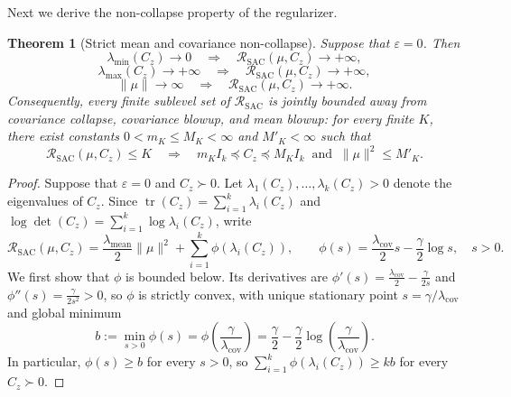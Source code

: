 \documentclass{article} %
\newtheorem{theorem}{Theorem}[section]
\theoremstyle{remark}
\begin{document}
{\color{blue}

Next we derive the non-collapse property of the regularizer.
 
\begin{theorem}[Strict mean and covariance non-collapse]
\label{thm:strict-covariance-non-collapse}
Suppose that \(\varepsilon=0\). Then
\begin{equation}
\lambda_{\min}(C_z)\to0
\quad\Longrightarrow\quad
\mathcal{R}_{\mathrm{SAC}}(\mu,C_z)\to+\infty,
\label{eq:covariance-collapse-barrier}
\end{equation}
\begin{equation}
\lambda_{\max}(C_z)\to+\infty
\quad\Longrightarrow\quad
\mathcal{R}_{\mathrm{SAC}}(\mu,C_z)\to+\infty,
\label{eq:covariance-scale-barrier}
\end{equation}
\begin{equation}
\|\mu\|\to\infty
\quad\Longrightarrow\quad
\mathcal{R}_{\mathrm{SAC}}(\mu,C_z)\to+\infty.
\label{eq:mean-blowup-barrier}
\end{equation}
Consequently, every finite sublevel set of \(\mathcal{R}_{\mathrm{SAC}}\) is jointly bounded away
from covariance collapse, covariance blowup, and mean blowup: for every finite \(K\), there exist
constants $0<m_K\leq M_K<\infty$ and $M'_K<\infty$ such that
\begin{equation}
\mathcal{R}_{\mathrm{SAC}}(\mu,C_z)\leq K
\quad\Longrightarrow\quad
m_KI_k
\preceq
C_z
\preceq
M_KI_k
\ \text{ and }\ \|\mu\|^2\leq M'_K.
\label{eq:covariance-spectral-sublevel-bound}
\end{equation}
\end{theorem}

\begin{proof}
Suppose that \(\varepsilon=0\) and \(C_z\succ0\). Let $\lambda_1(C_z),\ldots,\lambda_k(C_z)>0$
denote the eigenvalues of \(C_z\). Since $\operatorname{tr}(C_z)=\sum_{i=1}^k\lambda_i(C_z)$ and
$\log\det(C_z)=\sum_{i=1}^k\log\lambda_i(C_z)$, write
\[
\mathcal{R}_{\mathrm{SAC}}(\mu,C_z) = \frac{\lambda_{\mathrm{mean}}}{2}\|\mu\|^2+\sum_{i=1}^k
\phi\left(\lambda_i(C_z)\right),
\qquad
\phi(s)
=
\frac{\lambda_{\mathrm{cov}}}{2}s
-
\frac{\gamma}{2}\log s,
\quad
s>0.
\]
We first show that \(\phi\) is bounded below. Its derivatives are
$\phi'(s)=\frac{\lambda_{\mathrm{cov}}}{2}-\frac{\gamma}{2s}$ and
$\phi''(s)=\frac{\gamma}{2s^2}>0$, so \(\phi\) is strictly convex, with unique stationary point
$s=\gamma/\lambda_{\mathrm{cov}}$ and global minimum
\[
b
:=
\min_{s>0}\phi(s)
=
\phi\!\left(\frac{\gamma}{\lambda_{\mathrm{cov}}}\right)
=
\frac{\gamma}{2}
-
\frac{\gamma}{2}
\log\!\left(\frac{\gamma}{\lambda_{\mathrm{cov}}}\right).
\]
In particular, $\phi(s)\geq b$ for every $s>0$, so $\sum_{i=1}^k\phi(\lambda_i(C_z))\geq kb$ for
every $C_z\succ0$.


\end{proof}}
\end{document}
